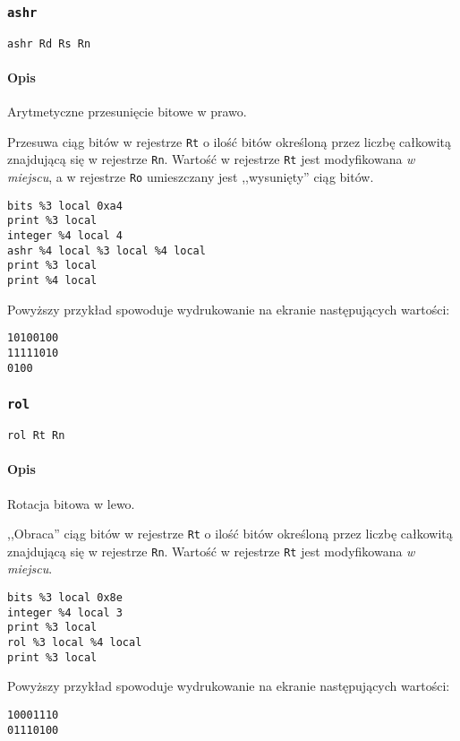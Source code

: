\subsubsection{\texttt{ashr}}

\begin{lstlisting}
ashr Rd Rs Rn
\end{lstlisting}

\paragraph*{Opis} Arytmetyczne przesunięcie bitowe w prawo.

Przesuwa ciąg bitów w rejestrze \texttt{Rt} o ilość bitów określoną przez liczbę
całkowitą znajdującą się w rejestrze \texttt{Rn}. Wartość w rejestrze
\texttt{Rt} jest modyfikowana \emph{w miejscu}, a w rejestrze \texttt{Ro}
umieszczany jest ,,wysunięty'' ciąg bitów.
\begin{lstlisting}
bits %3 local 0xa4
print %3 local
integer %4 local 4
ashr %4 local %3 local %4 local
print %3 local
print %4 local
\end{lstlisting}

Powyższy przykład spowoduje wydrukowanie na ekranie następujących wartości:
\begin{lstlisting}
10100100
11111010
0100
\end{lstlisting}

\subsubsection{\texttt{rol}}

\begin{lstlisting}
rol Rt Rn
\end{lstlisting}

\paragraph*{Opis} Rotacja bitowa w lewo.

,,Obraca'' ciąg bitów w rejestrze \texttt{Rt} o ilość bitów określoną przez
liczbę całkowitą znajdującą się w rejestrze \texttt{Rn}. Wartość w rejestrze
\texttt{Rt} jest modyfikowana \emph{w miejscu}.
\begin{lstlisting}
bits %3 local 0x8e
integer %4 local 3
print %3 local
rol %3 local %4 local
print %3 local
\end{lstlisting}

Powyższy przykład spowoduje wydrukowanie na ekranie następujących wartości:
\begin{lstlisting}
10001110
01110100
\end{lstlisting}


